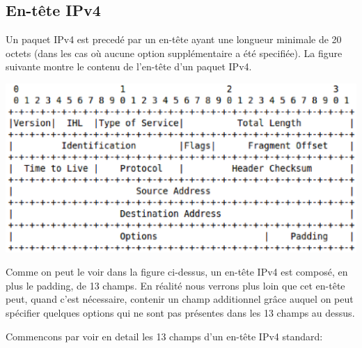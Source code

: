
\subsection{En-tête IPv4}
Un paquet IPv4 est precedé par un en-tête ayant une longueur minimale de 20 octets 
(dans les cas où aucune option supplémentaire a été specifiée).
La figure suivante montre le contenu de l'en-tête d'un paquet IPv4.


\includegraphics[width=15cm]{./pics/IPv4header.eps}


Comme on peut le voir dans la figure ci-dessus, un en-tête IPv4 est composé, en plus le padding, de
13 champs. En réalité nous verrons plus loin que cet en-tête
peut, quand c'est nécessaire, contenir un champ additionnel grâce auquel
on peut spécifier quelques options qui ne sont pas présentes dans les 13 champs
au dessus.


Commencons par voir en detail les 13 champs d'un en-tête IPv4 standard:

